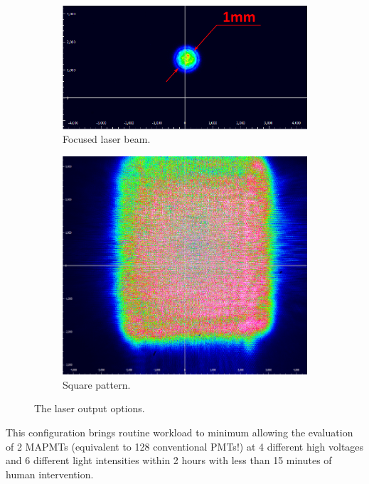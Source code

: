 \begin{figure}[bt]
	\centering
	\begin{subfigure}[b]{0.628\linewidth}
		\includegraphics[width=\textwidth]{beamspot.pdf}
		\caption{Focused laser beam.}
		\label{fig:beamopt1}
	\end{subfigure}
	\begin{subfigure}[b]{0.354\linewidth}
		\includegraphics[width=\textwidth]{beamsquare.pdf}
		\caption{Square pattern.}
		\label{fig:beamopt2}
	\end{subfigure}
	\caption{The laser output options.}
\end{figure}

This configuration brings routine workload to minimum allowing the evaluation of 2 MAPMTs (equivalent to 128 conventional PMTs!) at 4 different high voltages and 6 different light intensities within 2 hours with less than 15 minutes of human intervention.

